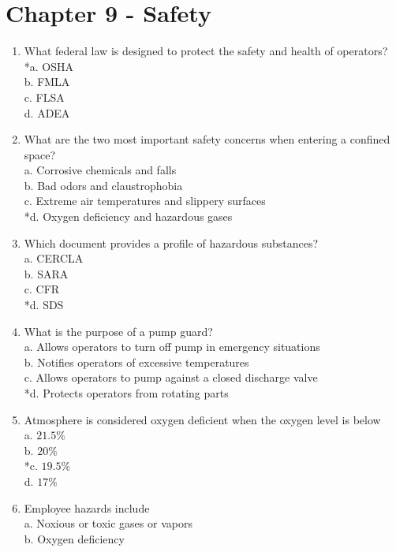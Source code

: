 \section{Chapter 9 - Safety}
\begin{enumerate}[1.]
\item What federal law is designed to protect the safety and health of operators?\\
*a. OSHA\\
b. FMLA\\
c. FLSA\\
d. ADEA\\
\item What are the two most important safety concerns when entering a confined space?\\
a. Corrosive chemicals and falls\\
b. Bad odors and claustrophobia\\
c. Extreme air temperatures and slippery surfaces\\
*d. Oxygen deficiency and hazardous gases\\
\item Which document provides a profile of hazardous substances?\\
a. CERCLA\\
b. SARA\\
c. CFR\\
*d. SDS\\
\item What is the purpose of a pump guard?\\
a. Allows operators to turn off pump in emergency situations\\
b. Notifies operators of excessive temperatures\\
c. Allows operators to pump against a closed discharge valve\\
*d. Protects operators from rotating parts\\
\item Atmosphere is considered oxygen deficient when the oxygen level is below\\
a. $21.5 \%$\\
b. $20 \%$\\
*c. $19.5 \%$\\
d. $17 \%$\\
\item Employee hazards include\\
a. Noxious or toxic gases or vapors\\
b. Oxygen deficiency\\

\end{enumerate}
